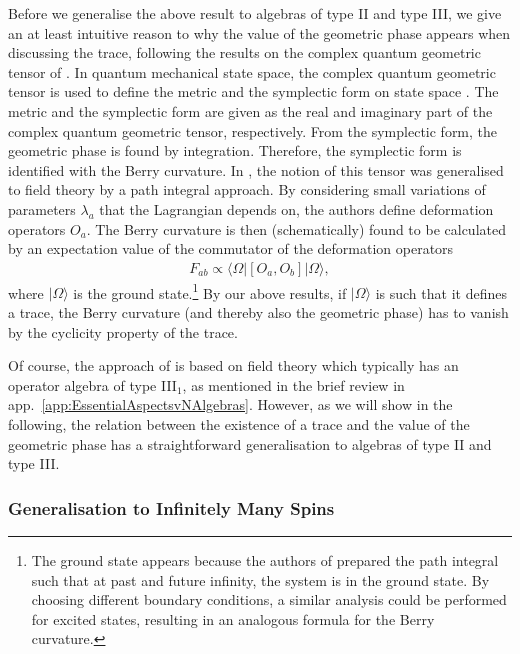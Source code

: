 \documentclass[a4paper,11pt]{article}
\newcommand{\1}{\mathds{1}}
\begin{document}
Before we generalise the above result to algebras of type II and type III, we give an at least intuitive reason to why the value of the geometric phase appears when discussing the trace, following the results on the complex quantum geometric tensor of \cite{Provost:1980nc,Alvarez-Jimenez:2017gus}. In quantum mechanical state space, the complex quantum geometric tensor is used to define the metric and the symplectic form on state space \cite{Provost:1980nc}. The metric and the symplectic form are given as the real and imaginary part of the complex quantum geometric tensor, respectively. From the symplectic form, the geometric phase is found by integration. Therefore, the symplectic form is identified with the Berry curvature. In \cite{Alvarez-Jimenez:2017gus}, the notion of this tensor was generalised to field theory by a path integral approach. By considering small variations of parameters $\lambda_a$ that the Lagrangian depends on, the authors define deformation operators $O_a$. The Berry curvature is then (schematically) found to be calculated by an expectation value of the commutator of the deformation operators
\begin{align}
    F_{ab}\propto\langle\Omega|[O_a,O_b]|\Omega\rangle,
\end{align}
where $|\Omega\rangle$ is the ground state.\footnote{The ground state appears because the authors of \cite{Alvarez-Jimenez:2017gus} prepared the path integral such that at past and future infinity, the system is in the ground state. By choosing different boundary conditions, a similar analysis could be performed for excited states, resulting in an analogous formula for the Berry curvature.} By our above results, if $|\Omega\rangle$ is such that it defines a trace, the Berry curvature (and thereby also the geometric phase) has to vanish by the cyclicity property of the trace.

Of course, the approach of \cite{Alvarez-Jimenez:2017gus} is based on field theory which typically has an operator algebra of type III$_1$, as mentioned in the brief review in app.~\ref{app:EssentialAspectsvNAlgebras}. However, as we will show in the following, the relation between the existence of a trace and the value of the geometric phase has a straightforward generalisation to algebras of type II and type III.

\subsubsection{Generalisation to Infinitely Many Spins}
\label{sec:TraceTypeIITypeIII}
\end{document}

